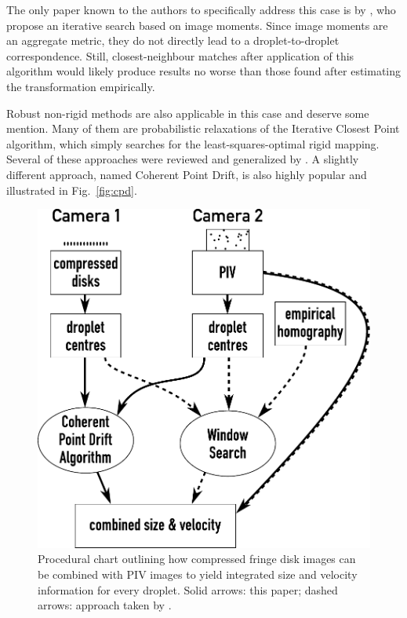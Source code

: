 \documentclass[11.5pt,oneside]{book}
\newcommand*{\figref}[1]{Fig.~\ref{#1}}
\begin{document}
The only paper known to the authors to specifically address this case is by
\citet{Chi11}, who propose an iterative search based on image moments. Since
image moments are an aggregate metric, they do not directly lead to a
droplet-to-droplet correspondence. Still, closest-neighbour matches after
application of this algorithm would likely produce results no worse than those
found after estimating the transformation empirically.

Robust non-rigid methods are also applicable in this case and deserve some
mention. Many of them are probabilistic relaxations of the Iterative Closest
Point algorithm, which simply searches for the least-squares-optimal rigid
mapping. Several of these approaches were reviewed and generalized by
\citet{Jian10}. A slightly different approach, named Coherent Point
Drift\cite{Myronenko10}, is also highly popular and illustrated in \figref{fig:cpd}.

\begin{figure}
    \centering
    \includegraphics[height=0.5\textheight]{img/compressed_flowchart.pdf}
    \caption{Procedural chart outlining how compressed fringe disk images can be combined with
    PIV images to yield integrated size and velocity information for every
    droplet. Solid arrows: this paper; dashed arrows: approach taken by
  \citet{Hardalupas10}.}
\label{fig:compressed-flowchart}
\end{figure}
\end{document}
